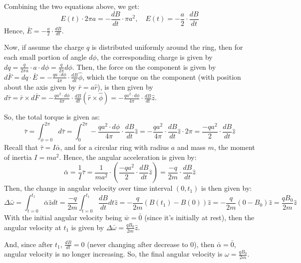 \documentclass{article}
\begin{document}
Combining the two equations above, we get:
$$E(t)\cdot 2\pi a=-\frac{dB}{dt}\cdot \pi a^2,\quad E(t)=-\frac{a}{2}\cdot\frac{dB}{dt}$$
Hence, $\bar{E}=-\frac{a}{2}\cdot \frac{dB}{dt}$.

\hfill

Now, if assume the charge $q$ is distributed uniformly around the ring, then for each small portion of angle $d\phi$, the corresponding charge is given by $dq = \frac{q}{2\pi a}\cdot a\cdot d\phi = \frac{q}{2\pi} d\phi$.
Then, the force on the component is given by $d\bar{F}=dq\cdot \bar{E} = -\frac{qa\cdot d\phi}{4\pi}\cdot \frac{dB}{dt}\hat{\phi}$, which the torque on the component (with position about the axis given by $\bar{r}=a\hat{r}$),
is then given by $d\bar{\tau}=\bar{r}\times d\bar{F} = -\frac{qa^2\cdot d\phi}{4\pi}\cdot \frac{dB}{dt}(\hat{r}\times \hat{\phi}) = -\frac{qa^2\cdot d\phi}{4\pi}\cdot \frac{dB}{dt}\hat{z}$.

So, the total torque is given as:
$$\bar{\tau}=\int_{\phi=0}^{2\pi}d\bar{\tau}=\int_{0}^{2\pi}-\frac{qa^2\cdot d\phi}{4\pi}\cdot \frac{dB}{dt}\hat{z} = -\frac{qa^2}{4\pi}\cdot \frac{dB}{dt}\hat{z} \cdot 2\pi = \frac{-qa^2}{2}\cdot \frac{dB}{dt}\hat{z}$$
Recall that $\bar{\tau} = I\bar{\alpha}$, and for a circular ring with radius $a$ and mass $m$, the moment of inertia $I=ma^2$. Hence, the angular acceleration is given by:
$$\bar{\alpha}=\frac{1}{I}\bar{\tau} = \frac{1}{ma^2}\cdot \left(\frac{-qa^2}{2}\cdot \frac{dB}{dt}\hat{z}\right) = \frac{-q}{2m}\cdot \frac{dB}{dt}\hat{z}$$
Then, the change in angular velocity over time interval $(0,t_1)$ is then given by:
$$\Delta\bar{\omega}=\int_{t=0}^{t_1}\bar{\alpha}\hat{z} dt = \frac{-q}{2m}\int_{t=0}^{t_1}\frac{dB}{dt} dt \hat{z} = -\frac{q}{2m}(B(t_1)-B(0))\hat{z} = -\frac{q}{2m}(0-B_0)\hat{z} = \frac{qB_0}{2m}\hat{z}$$
With the initial angular velocity being $\bar{w}=\bar{0}$ (since it's initially at rest), then the angular velocity at $t_1$ is given by $\Delta\bar{\omega} = \frac{qB_0}{2m}\hat{z}$.

And, since after $t_1$, $\frac{dB}{dt}=0$ (never changing after decrease to $0$), then $\bar{\alpha}=\bar{0}$, angular velocity is no longer increasing.
So, the final angular velocity is $\omega = \frac{qB_0}{2m}$.
\end{document}
